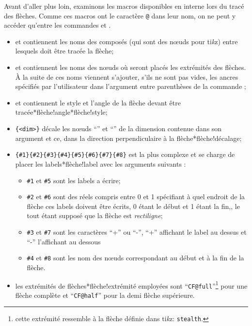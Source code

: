 \documentclass[10pt]{article}
\makeatletter
\newcommand\idx{\@ifstar{\let\print@or@not\@gobble\idx@}{\let\print@or@not\@firstofone\idx@}}
\newcommand\idx@[1]{%
	\ifcat\expandafter\noexpand\@car#1\@nil\relax%
		\expandafter\ifx\@car#1\@nil\protect
			\index{#1}%
			\print@or@not{#1}%
		\else
			\saveexpandmode\expandarg
			\StrSubstitute{\string#1}{\string @}{\@empty\protect\symbol{'100}}[\temp@]%
			\StrGobbleLeft\temp@1[\temp@]%
			\restoreexpandmode
			\expandafter\index\expandafter{\temp@ @\protect\texttt{\protect\textbackslash\temp@}}%
			\print@or@not{\texttt{\string#1}}%
		\fi
	\else
		\index{#1}%
		\print@or@not{#1}%
	\fi
}
\newcommand\TIKZ{ti\textit kz\xspace}
\makeatother
\begin{document}
Avant d'aller plus loin, examinons les macros disponibles en interne lors du tracé des flèches. Comme ces macros ont le caractère \verb-@- dans leur nom, on ne peut y accéder qu'entre les commandes \idx{\makeatletter} et \idx{\makeatother}.
\begin{itemize}
	\item \idx{\CF@arrow@start@name} et \idx{\CF@arrow@end@name} contiennent les noms des composés (qui sont des nœuds pour \TIKZ) entre lesquels doit être tracée la flèche;
	\item \idx{\CF@arrow@start@node} et \idx{\CF@arrow@end@node} contiennent les noms des nœuds où seront placés les extrémités des flèches. À la suite de ces noms viennent s'ajouter, s'ils ne sont pas vides, les ancres spécifiés par l'utilisateur dans l'argument entre parenthèses de la commande \idx\arrow;
	\item \idx{\CF@arrow@current@style} et \idx{\CF@arrow@current@angle} contiennent le style et l'angle de la flèche devant être tracée\idx*{flèche!angle}\idx*{flèche!style};
	\item \idx{\CF@arrow@shift@nodes}\verb-{<dim>}- décale les nœuds ``\idx{\CF@arrow@start@node}'' et ``\idx{\CF@arrow@end@node}'' de la dimension contenue dans son argument et ce, dans la direction perpendiculaire à la flèche\idx*{flèche!décalage};
	\item \idx{\CF@arrow@display@label}\verb/{#1}{#2}{#3}{#4}{#5}{#6}{#7}{#8}/ est la plus complexe et se charge de placer les labels\idx*{flèche!label} avec les arguments suivants :
	\begin{itemize}
		\item \verb-#1- et \verb-#5- sont les labels a écrire;
		\item \verb-#2- et \verb-#6- sont des réels compris entre 0 et 1 spécifiant à quel endroit de la flèche ces labels doivent être écrits, 0 étant le début et 1 étant la fin,, le tout étant supposé que la flèche est \emph{rectiligne};
		\item \verb-#3- et \verb-#7- sont les caractères ``+'' ou ``-'', ``+'' affichant le label au dessus et ``-'' l'affichant au dessous
		\item \verb-#4- et \verb-#8- sont les nom des nœuds correspondant au début et à la fin de la flèche.
	\end{itemize}
	\item les extrémités de flèches\idx*{flèche!extrémité} employées sont ``\verb-CF@full-''\footnote{cette extrémité ressemble à la flèche définie dans \TIKZ : \texttt{stealth}.} pour une flèche complète et ``\verb-CF@half-'' pour la demi flèche supérieure.
\end{itemize}
\end{document}
